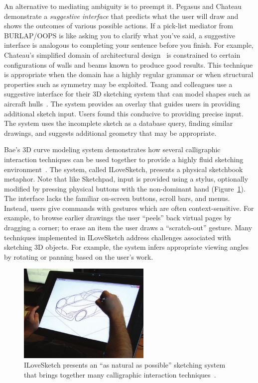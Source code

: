 An alternative to mediating ambiguity is to preempt it. Pegasus and
Chateau~\cite{igarashi-pegasus,igarashi-suggestive} demonstrate a
\textit{suggestive interface} that predicts what the user will draw
and shows the outcomes of various possible actions. If a pick-list
mediator from BURLAP/OOPS is like asking you to clarify what you've
said, a suggestive interface is analogous to completing your sentence
before you finish. For example, Chateau's simplified domain of
architectural design~\cite{igarashi-suggestive} is constrained to
certain configurations of walls and beams known to produce good
results. This technique is appropriate when the domain has a highly
regular grammar or when structural properties such as symmetry may be
exploited. Tsang and colleagues use a suggestive interface for their
3D sketching system that can model shapes such as aircraft
hulls~\cite{tsang-3d-sketching}. The system provides an overlay that
guides users in providing additional sketch input. Users found this
conducive to providing precise input. The system uses the incomplete
sketch as a database query, finding similar drawings, and suggests
additional geometry that may be appropriate.

Bae's 3D curve modeling system demonstrates how several calligraphic
interaction techniques can be used together to provide a highly fluid
sketching environment~\cite{bae-ilovesketch}. The system, called
\nohyphens{ILoveSketch}, presents a physical sketchbook metaphor. Note
that like Sketchpad, input is provided using a stylus, optionally
modified by pressing physical buttons with the non-dominant hand
(Figure~\ref{fig:ilovesketch}). The interface lacks the familiar
on-screen buttons, scroll bars, and menus. Instead, users give
commands with gestures which are often context-sensitive. For example,
to browse earlier drawings the user ``peels'' back virtual pages by
dragging a corner; to erase an item the user draws a ``scratch-out''
gesture. Many techniques implemented in \nohyphens{ILoveSketch}
address challenges associated with sketching 3D objects. For example,
the system infers appropriate viewing angles by rotating or panning
based on the user's work.

\begin{figure}
   \centering
   \includegraphics[width=2.5in]{img/ilovesketch.pdf} 
   \caption{ILoveSketch presents an ``as natural as possible''
     sketching system that brings together many calligraphic
     interaction techniques~\cite{bae-ilovesketch}.}
   \label{fig:ilovesketch}
\end{figure}

